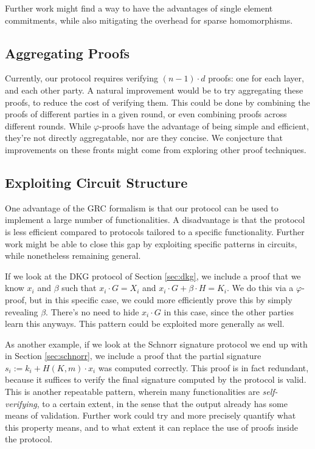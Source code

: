 Further work might find a way to have the advantages of single
element commitments, while also mitigating the overhead
for sparse homomorphisms.

\subsection{Aggregating Proofs}

Currently, our protocol requires verifying
$(n - 1) \cdot d$ proofs: one for each layer, and each other party.
A natural improvement would be to try aggregating these
proofs, to reduce the cost of verifying them.
This could be done by combining the proofs of different parties
in a given round, or even combining proofs across different rounds.
While $\varphi$-proofs have the advantage of being
simple and efficient, they're not directly aggregatable, nor
are they concise.
We conjecture that improvements on these fronts might come from
exploring other proof techniques.

\subsection{Exploiting Circuit Structure}

One advantage of the GRC formalism is that our protocol
can be used to implement a large number of functionalities.
A disadvantage is that the protocol is less efficient compared
to protocols tailored to a specific functionality.
Further work might be able to close this gap by exploiting
specific patterns in circuits, while nonetheless
remaining general.

If we look at the DKG protocol of Section \ref{sec:dkg},
we include a proof that we know $x_i$ and $\beta$ such that
$x_i \cdot G = X_i$ and $x_i \cdot G + \beta \cdot H = K_i$.
We do this via a $\varphi$-proof, but in this specific case,
we could more efficiently prove this by simply revealing $\beta$.
There's no need to hide $x_i \cdot G$ in this case, since the
other parties learn this anyways.
This pattern could be exploited more generally as well.

As another example, if we look at the Schnorr signature
protocol we end up with in Section \ref{sec:schnorr},
we include a proof that the partial signature $s_i := k_i + H(K, m) \cdot x_i$
was computed correctly.
This proof is in fact redundant, because it suffices to verify
the final signature computed by the protocol is valid.
This is another repeatable pattern, wherein many functionalities
are \emph{self-verifying}, to a certain extent,
in the sense that the output already has some means of validation.
Further work could try and more precisely quantify what
this property means, and to what extent it can replace the use
of proofs inside the protocol.

